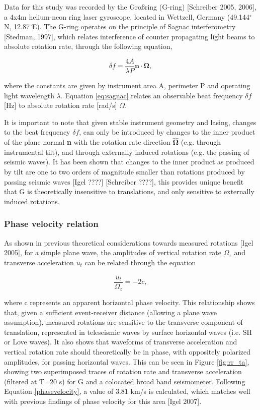 \documentclass{gji}
\begin{document}
Data for this study was recorded by the Gro\ss ring (G-ring) [Schreiber 2005, 2006], a 4x4m helium-neon ring laser gyroscope, located in Wettzell, Germany (49.144$^\circ$N, 12.87$^\circ$E). The G-ring operates on the principle of Sagnac interferometry [Stedman, 1997], which relates interference of counter propagating light beams to absolute rotation rate, through the following equation, 

\begin{equation}\label{eq:sagnac}
	\delta f = \frac{4A}{\lambda P}\mathbf{n}\cdot \mathbf{\Omega},
\end{equation}

\noindent where the constants are given by instrument area A, perimeter P and operating light wavelength $\lambda$. Equation \ref{eq:sagnac} relates an observable beat frequency $\delta f$ [Hz] to absolute rotation rate [rad/s] $\Omega$.

It is important to note that given stable instrument geometry and lasing, changes to the beat frequency $\delta f$, can only be introduced by changes to the inner product of the plane normal {\bfseries n} with the rotation rate direction $\mathbf{\hat{\Omega}}$ (e.g. through instrumental tilt), and through externally induced rotations (e.g. the passing of seismic waves). It has been shown that changes to the inner product as produced by tilt are one to two orders of magnitude smaller than rotations produced by passing seismic waves [Igel ????] [Schreiber ????], this provides unique benefit that G is theoretically insensitive to translations, and only sensitive to externally induced rotations.

\subsubsection{Phase velocity relation}\label{phasevel}
As shown in previous theoretical considerations towards measured rotations [Igel 2005], %
for a simple plane wave, the amplitudes of vertical rotation rate $\Omega_z$  and transverse acceleration $\ddot{u}_t$ can be related through the equation 

\begin{equation}\label{phasevelocity}
	\frac{\ddot{u}_t}{\Omega_z} = -2c,
\end{equation}

\noindent where c represents an apparent horizontal phase velocity. This relationship shows that, given a sufficient event-receiver distance (allowing a plane wave assumption), measured rotations are sensitive to the transverse component of translation, represented in teleseismic waves by surface horizontal waves (i.e. SH or Love waves). It also shows that waveforms of transverse acceleration and vertical rotation rate should theoretically be in phase, with oppositely polarized amplitudes, for passing horizontal waves. This can be seen in Figure \ref{fig:rr_ta}, showing two superimposed traces of rotation rate and transverse acceleration (filtered at T=20 s) for G and a colocated broad band seismometer. Following Equation \ref{phasevelocity}, a value of 3.81 km/s is calculated, which matches well with previous findings of phase velocity for this area [Igel 2007].
\end{document}

